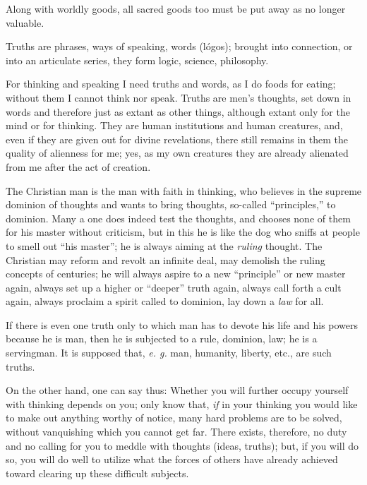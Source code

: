 \documentclass[12pt,a4paper]{book}
\begin{document}
Along with worldly goods, all sacred goods too must be put away as no longer 
valuable.

Truths are phrases, ways of speaking, words (l\'ogos); brought into 
connection, or into an articulate series, they form logic, science, 
philosophy.

For thinking and speaking I need truths and words, as I do foods for eating; 
without them I cannot think nor speak. Truths are men's thoughts, set down in 
words and therefore just as extant as other things, although extant only for 
the mind or for thinking. They are human institutions and human creatures, 
and, even if they are given out for divine revelations, there still remains in 
them the quality of alienness for me; yes, as my own creatures they are 
already alienated from me after the act of creation.

The Christian man is the man with faith in thinking, who believes in the 
supreme dominion of thoughts and wants to bring thoughts, so-called 
``principles,'' to dominion. Many a one does indeed test the thoughts, and 
chooses none of them for his master without criticism, but in this he is like 
the dog who sniffs at people to smell out ``his master''; he is always 
aiming at the \textit{ruling} thought. The Christian may reform and revolt an 
infinite deal, may demolish the ruling concepts of centuries; he will always 
aspire to a new ``principle'' or new master again, always set up a higher or 
``deeper'' truth again, always call forth a cult again, always proclaim a 
spirit called to dominion, lay down a \textit{law} for all.

If there is even one truth only to which man has to devote his life and his 
powers because he is man, then he is subjected to a rule, dominion, law; he is 
a servingman. It is supposed that, \textit{e. g.} man, humanity, liberty, 
etc., are such truths.

On the other hand, one can say thus: Whether you will further occupy yourself 
with thinking depends on you; only know that, \textit{if} in your thinking you 
would like to make out anything worthy of notice, many hard problems are to be 
solved, without vanquishing which you cannot get far. There exists, therefore, 
no duty and no calling for you to meddle with thoughts (ideas, truths); but, 
if you will do so, you will do well to utilize what the forces of others have 
already achieved toward clearing up these difficult subjects.
\end{document}
